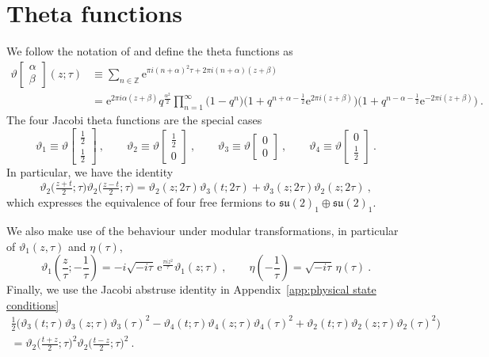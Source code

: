 \documentclass[12pt,a4paper]{article}
\newcommand{\be}{\begin{equation}}
\newcommand{\ee}{\end{equation}}
\begin{document}
\section{Theta functions}\label{app:theta}
We follow the notation of \cite{Blumenhagen:2013fgp} and define the theta functions as
\begin{align}
\vartheta\!\begin{bmatrix}
  \alpha \\
  \beta
  \end{bmatrix}(z;\tau)&\equiv\sum_{n\in\mathds Z}\mathrm{e}^{\pi i(n+\alpha)^2\tau+2\pi i(n+\alpha)(z+\beta)}\\
  &=\mathrm{e}^{2\pi i\alpha (z+\beta)} q^{\frac{\alpha^2}{2}} \prod_{n=1}^\infty \big(1-q^n \big) \big(1+q^{n+\alpha-\frac{1}{2}} \mathrm{e}^{2\pi i(z+\beta)} \big)\big(1+q^{n-\alpha-\frac{1}{2}} \mathrm{e}^{-2\pi i(z+\beta)} \big)\ .
\end{align}
The four Jacobi theta functions are the special cases
\be
\vartheta_1\equiv\vartheta\!\begin{bmatrix}
  \frac{1}{2} \\
  \frac{1}{2}
  \end{bmatrix}\ ,\qquad
\vartheta_2\equiv\vartheta\!\begin{bmatrix}
  \frac{1}{2} \\
  0
  \end{bmatrix}\ ,\qquad
\vartheta_3\equiv\vartheta\!\begin{bmatrix}
  0 \\
  0
  \end{bmatrix}\ ,\qquad
\vartheta_4\equiv\vartheta\!\begin{bmatrix}
  0 \\
  \frac{1}{2}
  \end{bmatrix}\ .
\ee
In particular, we have the identity 
\be 
\vartheta_2\big(\tfrac{z+t}{2};\tau)\vartheta_2\big(\tfrac{z-t}{2};\tau\big)=\vartheta_2(z;2\tau)\vartheta_3(t;2\tau)+\vartheta_3(z;2\tau)\vartheta_2(z;2\tau)\ , \label{eq:equivalence four fermions and su2su2}
\ee
which expresses the equivalence of four free fermions to $\mathfrak{su}(2)_1 \oplus \mathfrak{su}(2)_1$.

We also make use of the behaviour under modular transformations, in particular of $\vartheta_1(z,\tau)$ and $\eta(\tau)$, 
\be 
\vartheta_1\left(\frac{z}{\tau};-\frac{1}{\tau}\right)=-i \sqrt{-i \tau} \, \mathrm{e}^{\frac{\pi i z^2}{\tau}} \vartheta_1(z;\tau)\  , \qquad 
\eta\left(-\frac{1}{\tau}\right) =  \sqrt{-i \tau} \, \eta(\tau) \ .
 \label{eq:theta 1 transformation}
\ee
Finally, we use the Jacobi abstruse identity in Appendix~\ref{app:physical state conditions}
\begin{multline}
\frac{1}{2}\Big(\vartheta_3(t;\tau)\vartheta_3(z;\tau)\vartheta_3(\tau)^2-\vartheta_4(t;\tau)\vartheta_4(z;\tau)\vartheta_4(\tau)^2+\vartheta_2(t;\tau)\vartheta_2(z;\tau)\vartheta_2(\tau)^2\Big)\\
=\vartheta_2\big(\tfrac{t+z}{2};\tau\big)^2\vartheta_2\big(\tfrac{t-z}{2};\tau\big)^2 \ . \label{eq:Jacobi abstruse identity}
\end{multline}
\end{document}
